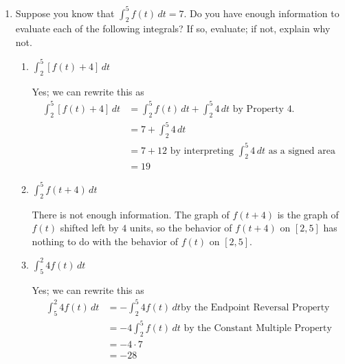 \documentclass[main]{subfiles}
\begin{document}
\begin{enumerate}[resume]
\item 

  Suppose you know that $\displaystyle \int_2^5 f(t)\,dt = 7$.  Do you have
  enough information to evaluate each of the following integrals?  If so,
  evaluate; if not, explain why not.
  \begin{enumerate}
  \item
    \begin{problem}[\vfill]
      $\displaystyle \int_2^5 [f(t) + 4]\,dt$
    \end{problem}

    \begin{solution}
      Yes; we can rewrite this as
      \begin{align*}
        \int_2^5 [f(t) + 4]\,dt &= \int_2^5 f(t)\,dt + \int_2^5 4\,dt
        \text{ by Property
            {{4.}}} \\
        &= 7 + \int_2^5 4\,dt \\
        &= 7 + 12 \text{ by interpreting $\displaystyle \int_2^5 4\,dt$ as
          a signed area} \\
        &= \boxed{19}
      \end{align*}
    \end{solution}

  \item


    \begin{problem}[\vfill]
      $\displaystyle \int_2^5 f(t + 4)\,dt$
    \end{problem}

    \begin{solution}
      There is not enough information.  The graph of $f(t + 4)$ is the
      graph of $f(t)$ shifted left by $4$ units, so the behavior of $f(t
      + 4)$ on $[2, 5]$ has nothing to do with the behavior of $f(t)$ on
      $[2, 5]$. 
    \end{solution}

  \item
    \begin{problem}[\vfill]
      $\displaystyle \int_5^2 4 f(t)\,dt$
    \end{problem}

    \begin{solution}
      Yes; we can rewrite this as
      \begin{align*}
        \int_5^2 4 f(t)\,dt &= - \int_2^5 4 f(t)\,dt \text{
            by the Endpoint Reversal Property} \\
        &= - 4 \int_2^5 f(t)\,dt \text{ by the Constant Multiple Property} \\
        &= -4 \cdot 7 \\
        &= \boxed{-28}
      \end{align*}
    \end{solution}


\end{enumerate}
\end{enumerate}
\end{document}
